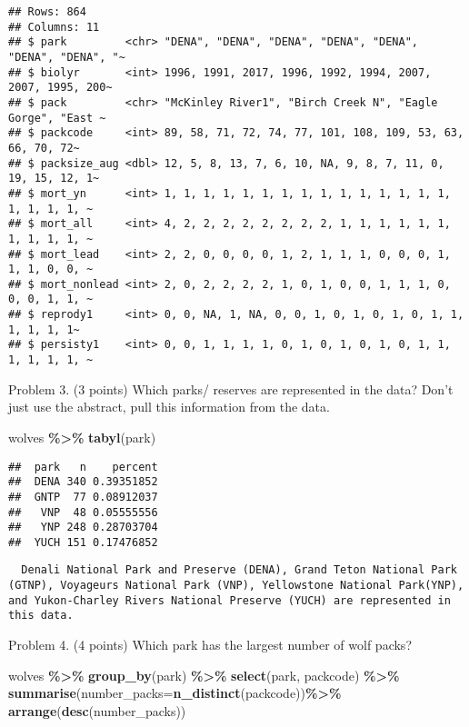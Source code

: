 \documentclass[
]{article}
\newenvironment{Shaded}{\begin{snugshade}}{\end{snugshade}}
\newcommand{\AttributeTok}[1]{\textcolor[rgb]{0.13,0.29,0.53}{#1}}
\newcommand{\FunctionTok}[1]{\textcolor[rgb]{0.13,0.29,0.53}{\textbf{#1}}}
\newcommand{\NormalTok}[1]{#1}
\newcommand{\SpecialCharTok}[1]{\textcolor[rgb]{0.81,0.36,0.00}{\textbf{#1}}}
\begin{document}
\begin{verbatim}
## Rows: 864
## Columns: 11
## $ park         <chr> "DENA", "DENA", "DENA", "DENA", "DENA", "DENA", "DENA", "~
## $ biolyr       <int> 1996, 1991, 2017, 1996, 1992, 1994, 2007, 2007, 1995, 200~
## $ pack         <chr> "McKinley River1", "Birch Creek N", "Eagle Gorge", "East ~
## $ packcode     <int> 89, 58, 71, 72, 74, 77, 101, 108, 109, 53, 63, 66, 70, 72~
## $ packsize_aug <dbl> 12, 5, 8, 13, 7, 6, 10, NA, 9, 8, 7, 11, 0, 19, 15, 12, 1~
## $ mort_yn      <int> 1, 1, 1, 1, 1, 1, 1, 1, 1, 1, 1, 1, 1, 1, 1, 1, 1, 1, 1, ~
## $ mort_all     <int> 4, 2, 2, 2, 2, 2, 2, 2, 2, 1, 1, 1, 1, 1, 1, 1, 1, 1, 1, ~
## $ mort_lead    <int> 2, 2, 0, 0, 0, 0, 1, 2, 1, 1, 1, 0, 0, 0, 1, 1, 1, 0, 0, ~
## $ mort_nonlead <int> 2, 0, 2, 2, 2, 2, 1, 0, 1, 0, 0, 1, 1, 1, 0, 0, 0, 1, 1, ~
## $ reprody1     <int> 0, 0, NA, 1, NA, 0, 0, 1, 0, 1, 0, 1, 0, 1, 1, 1, 1, 1, 1~
## $ persisty1    <int> 0, 0, 1, 1, 1, 1, 0, 1, 0, 1, 0, 1, 0, 1, 1, 1, 1, 1, 1, ~
\end{verbatim}

Problem 3. (3 points) Which parks/ reserves are represented in the data?
Don't just use the abstract, pull this information from the data.

\begin{Shaded}
\begin{Highlighting}[]
\NormalTok{wolves }\SpecialCharTok{\%\textgreater{}\%}
  \FunctionTok{tabyl}\NormalTok{(park)}
\end{Highlighting}
\end{Shaded}

\begin{verbatim}
##  park   n    percent
##  DENA 340 0.39351852
##  GNTP  77 0.08912037
##   VNP  48 0.05555556
##   YNP 248 0.28703704
##  YUCH 151 0.17476852
\end{verbatim}

\begin{verbatim}
  Denali National Park and Preserve (DENA), Grand Teton National Park (GTNP), Voyageurs National Park (VNP), Yellowstone National Park(YNP), and Yukon-Charley Rivers National Preserve (YUCH) are represented in this data.
\end{verbatim}

Problem 4. (4 points) Which park has the largest number of wolf packs?

\begin{Shaded}
\begin{Highlighting}[]
\NormalTok{wolves }\SpecialCharTok{\%\textgreater{}\%}
  \FunctionTok{group\_by}\NormalTok{(park) }\SpecialCharTok{\%\textgreater{}\%}
  \FunctionTok{select}\NormalTok{(park, packcode) }\SpecialCharTok{\%\textgreater{}\%}
  \FunctionTok{summarise}\NormalTok{(}\AttributeTok{number\_packs=}\FunctionTok{n\_distinct}\NormalTok{(packcode))}\SpecialCharTok{\%\textgreater{}\%}
  \FunctionTok{arrange}\NormalTok{(}\FunctionTok{desc}\NormalTok{(number\_packs))}
\end{Highlighting}
\end{Shaded}
\end{document}
